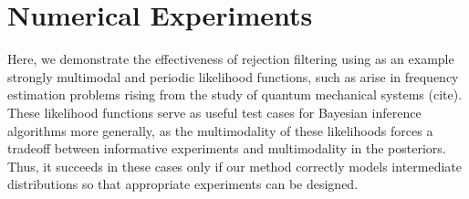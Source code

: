 \documentclass[twoside]{article}
\begin{document}
\section{Numerical Experiments}
\label{sec:numerical-experiments}

Here, we demonstrate the effectiveness of rejection filtering using as an
example strongly multimodal and periodic likelihood functions, such as arise
in frequency estimation problems rising from the study of quantum mechanical
systems (cite). These likelihood functions serve as useful test cases for
Bayesian inference algorithms more generally, as the multimodality of these
likelihoods forces a tradeoff between informative experiments and
multimodality in the posteriors. Thus, it succeeds in these cases only
if our method correctly models intermediate distributions so that appropriate
experiments can be designed.
\end{document}
